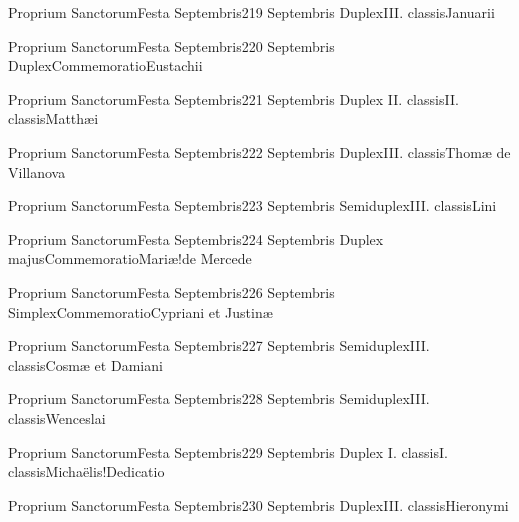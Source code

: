 \documentclass[invitatoriale-romanum.tex]{subfiles}
\begin{document}
	{Proprium Sanctorum}{Festa Septembris}{2}{19 Septembris}
	{Duplex}{III. classis}{Januarii}
	{}
	{}

	{Proprium Sanctorum}{Festa Septembris}{2}{20 Septembris}
	{Duplex}{Commemoratio}{Eustachii}
	{}
	{\invitferia}

	{Proprium Sanctorum}{Festa Septembris}{2}{21 Septembris}
	{Duplex II. classis}{II. classis}{Matthæi}
	{}
	{}

	{Proprium Sanctorum}{Festa Septembris}{2}{22 Septembris}
	{Duplex}{III. classis}{Thomæ de Villanova}
	{}
	{}

	{Proprium Sanctorum}{Festa Septembris}{2}{23 Septembris}
	{Semiduplex}{III. classis}{Lini}
	{}
	{}

	{Proprium Sanctorum}{Festa Septembris}{2}{24 Septembris}
	{Duplex majus}{Commemoratio}{Mariæ!de Mercede}
	{}
	{\invitferia}

	{Proprium Sanctorum}{Festa Septembris}{2}{26 Septembris}
	{Simplex}{Commemoratio}{Cypriani et Justinæ}
	{}
	{}

	{Proprium Sanctorum}{Festa Septembris}{2}{27 Septembris}
	{Semiduplex}{III. classis}{Cosmæ et Damiani}
	{}
	{}

	{Proprium Sanctorum}{Festa Septembris}{2}{28 Septembris}
	{Semiduplex}{III. classis}{Wenceslai}
	{}
	{}

\pagebreak

	{Proprium Sanctorum}{Festa Septembris}{2}{29 Septembris}
	{Duplex I. classis}{I. classis}{Michaëlis!Dedicatio}
	{}
	{}

	{Proprium Sanctorum}{Festa Septembris}{2}{30 Septembris}
	{Duplex}{III. classis}{Hieronymi}
	{}
	{}
\end{document}
